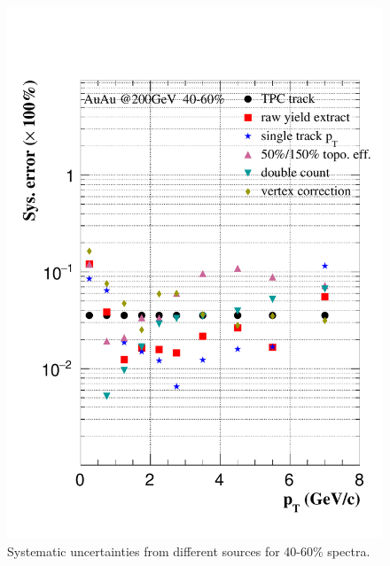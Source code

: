 \begin{figure}[htbp]
\begin{minipage}[htbp]{0.47\linewidth}
\includegraphics[width=1.0\textwidth,angle=0]{figure/Run14_D0HFT/sysErr_40_60_2.pdf} 
\caption{ Systematic uncertainties from different sources for 40-60\% spectra. \label{sysErr_40_60}}
\end{minipage}
\end{figure}

